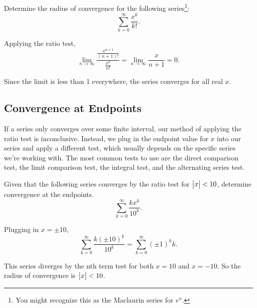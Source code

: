 \begin{example}
	Determine the radius of convergence for the following series\footnote{You might recognize this as the Maclaurin series for $e^x$.}:
	\begin{equation*}
		\sum_{k=0}^{\infty}{\frac{x^k}{k!}}.
	\end{equation*}
\end{example}
\begin{answer}
	Applying the ratio test,
	\begin{equation*}
		\lim_{n\to\infty}{\frac{\frac{x^{n+1}}{(n+1)!}}{\frac{x^n}{n!}}} = \lim_{n\to\infty}{\frac{x}{n+1}} = 0.
	\end{equation*}
	
	Since the limit is less than 1 everywhere, the series converges for all real $x$.
\end{answer}

\subsection{Convergence at Endpoints}
If a series only converges over some finite interval, our method of applying the ratio test is inconclusive.
Instead, we plug in the endpoint value for $x$ into our series and apply a different test, which usually depends on the specific series we're working with.
The most common tests to use are the direct comparison test, the limit comparison test, the integral test, and the alternating series test.

\begin{example}
	Given that the following series converges by the ratio test for $\big\lvert x \big\rvert<10$, determine convergence at the endpoints.
	\begin{equation*}
		\sum_{k=0}^{\infty}{\frac{kx^k}{10^k}}.
	\end{equation*}
\end{example}
\begin{answer}
	Plugging in $x=\pm10$,
	\begin{equation*}
		\sum_{k=0}^{\infty}{\frac{k(\pm10)^k}{10^k}} = \sum_{k=0}^{\infty}{(\pm 1)^k k}.
	\end{equation*}
	
	This series diverges by the nth term test for both $x=10$ and $x=-10$.
	So the radius of convergence is $\big\lvert x \big\rvert < 10$.
\end{answer}

